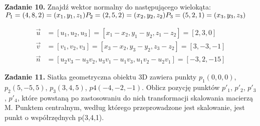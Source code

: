 \documentclass[a4paper]{article}
\begin{document}
\noindent\textbf{Zadanie 10.}
\noindent\textnormal{Znajdź wektor normalny do następującego wielokąta:}\\
$P_1 = (4,8,2) = (x_1,y_1,z_1)\\
P_2 = (2 ,5 , 2) = (x_2,y_2,z_2) \\
P_3 = (5 , 2 , 1)= (x_3,y_3,z_3) $

\begin{align*}
\vec{u} &= \left[u_1 , u_2 , u_3\right] = \left[x_1 - x_2 , y_1 - y_2 , z_1-z_2\right] = \left[2 , 3 , 0\right] \\
\vec{v} &= \left[v_1 , v_2 , v_3\right] = \left[x_3 - x_2 , y_3 - y_2 , z_3-z_2\right] = \left[3 , -3 , -1\right]\\
\vec{n} &= \left[u_2v_3 - u_3v_2 , u_3v_1 - u_1v_3 , u_1v_2 - u_2v_1\right] = \left[-3 , 2 , -15 \right]
\end{align*}

\noindent\textbf{Zadanie 11.}
\noindent\textnormal{Siatka geometryczna obiektu 3D zawiera punkty $p_1(0,0,0)$, $p_2(5,-5,5)$, $p_3(3,4,5)$,
$p4(-4,-2,-1)$. Oblicz pozycję punktów $p'_1$, $p'_2$, $p'_3$, $p'_4$, które powstaną po zastosowaniu do nich transformacji skalowania macierzą M. Punktem centralnym, według którego przeprowadzone jest skalowanie, jest punkt o współrzędnych p(3,4,1).}\\
\end{document}
